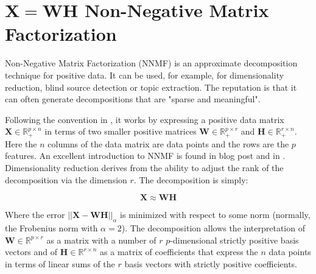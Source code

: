 \section{$\mathbf{X}=\mathbf{W}\mathbf{H}$ Non-Negative Matrix Factorization}

Non-Negative Matrix Factorization (NNMF) is an approximate decomposition technique for positive data. It can be used, for example, for dimensionality reduction, blind source detection or topic extraction. The reputation is that it can often generate decompositions that are "sparse and meaningful". 

Following the convention in , it works by expressing a positive data matrix $\mathbf{X}\in\mathbb{R}^{p\times n}_+$ in terms of two smaller positive matrices $\mathbf{W}\in\mathbb{R}_+^{p\times r}$ and $\mathbf{H}\in \mathbb{R}^{r\times n}_+$. Here the $n$ columns of the data matrix are data points and the rows are the $p$ features. An excellent introduction to NNMF is found in  blog post and in . Dimensionality reduction derives from the ability to adjust the rank of the decomposition via the dimension $r$. The decomposition is simply:

\begin{equation}
\mathbf{X} \approx \mathbf{WH}
\end{equation}

Where the error $||\mathbf{X} - \mathbf{WH}||_\alpha$ is minimized with respect to some norm (normally, the Frobenius norm with $\alpha=2$). The decomposition allows the interpretation of $\mathbf{W} \in \mathbb{R}^{p\times r}$ as a matrix with a number of $r$ $p$-dimensional strictly positive basis vectors and of $\mathbf{H} \in \mathbb{R}^{r\times n}$ as a matrix of coefficients that express the $n$ data points in terms of linear sums of the $r$ basis vectors with strictly positive coefficients. 

